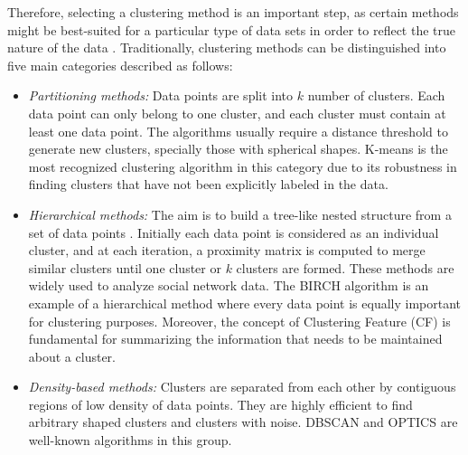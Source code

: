 Therefore, selecting a clustering method is an important step, as certain methods might be best-suited for a particular type of data sets in order to reflect the true nature of the data \cite{berkhin2006survey, han2011data}. Traditionally, clustering methods can be distinguished into five main categories described as follows: 


\begin{itemize}

    \item\textit{Partitioning methods:} Data points are split into $k$ number of clusters. Each data point can only belong to one cluster, and each cluster must contain at least one data point. The algorithms usually require a distance threshold %
    to generate new clusters, specially those with spherical shapes.   %
    K-means is the most recognized clustering algorithm in this category due to its robustness in finding clusters that have not been explicitly labeled in the data.
    
    \item\textit{Hierarchical methods:} The aim is to build a tree-like nested structure from a set of data points \cite{swarndeep2016overview}. Initially each data point is considered as an individual cluster, and at each iteration, a proximity matrix is computed to merge similar clusters until one cluster or $k$ clusters are formed. These methods are widely used to analyze social network data. The BIRCH algorithm is an example of a hierarchical method where every data point is equally important for clustering purposes. Moreover, the concept of Clustering Feature (CF) is fundamental for summarizing the information that needs to be maintained about a cluster.
    
    
    \item\textit{Density-based methods:} Clusters are separated from each other by contiguous regions of low density of data points. They are highly efficient to find arbitrary shaped clusters and clusters with noise.  DBSCAN and OPTICS are well-known algorithms in this group.
    

\end{itemize}
